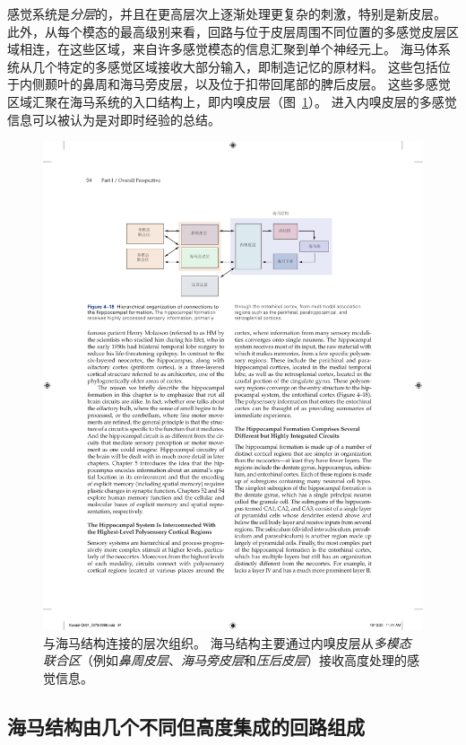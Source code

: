 感觉系统是\textit{分层}的，并且在更高层次上逐渐处理更复杂的刺激，特别是新皮层。
此外，从每个模态的最高级别来看，回路与位于皮层周围不同位置的多感觉皮层区域相连，在这些区域，来自许多感觉模态的信息汇聚到单个神经元上。
海马体系统从几个特定的多感觉区域接收大部分输入，即制造记忆的原材料。
这些包括位于内侧颞叶的鼻周和海马旁皮层，以及位于扣带回尾部的脾后皮层。
这些多感觉区域汇聚在海马系统的入口结构上，即内嗅皮层（图~\ref{fig:4_18}）。 
进入内嗅皮层的多感觉信息可以被认为是对即时经验的总结。


\begin{figure}[htbp]
	\centering
	\includegraphics[width=0.95\linewidth]{chap04/fig_4_18}
	\caption{与海马结构连接的层次组织。
		海马结构主要通过内嗅皮层从\textit{多模态联合区}（例如\textit{鼻周皮层}、\textit{海马旁皮层}和\textit{压后皮层}）接收高度处理的感觉信息。}
	\label{fig:4_18}
\end{figure}



\subsection{海马结构由几个不同但高度集成的回路组成}

